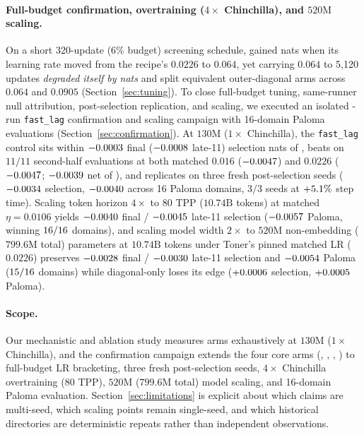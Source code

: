 \paragraph{Full-budget confirmation, overtraining ($4\times$ Chinchilla), and $520\text{M}$ scaling.}
On a short 320-update (6\% budget) screening schedule,  gained
\lrHeadroom{} nats when its learning rate moved from the recipe's $0.0226$ to
$0.064$, yet carrying $0.064$ to 5{,}120 updates \emph{degraded 
itself by \waveTwelveMuontSelDiff{} nats} and split equivalent outer-diagonal
arms across $0.064$ and $0.0905$ (Section~\ref{sec:tuning}). To close full-budget
tuning, same-runner null attribution, post-selection replication, and scaling,
we executed an isolated \confTotalRuns{}-run \texttt{fast\_lag} confirmation and
scaling campaign with \confPalomaCount{} 16-domain Paloma evaluations
(Section~\ref{sec:confirmation}). At $130\text{M}$ ($1\times$ Chinchilla), the
\texttt{fast\_lag}  control sits within
$-0.0003{}$ final ($-0.0008{}$ late-11) selection
nats of ,  beats  on $11/11$
second-half evaluations at both matched $0.016$ ($-0.0047{}$)
and $0.0226$ ($-0.0047{}$; $-0.0039{}$
net of ), and replicates on three fresh post-selection seeds
($-0.0034{}$ selection, $-0.0040{}$ across 16
Paloma domains, $3/3$ seeds at $+5.1\%$ step time). Scaling token
horizon $4\times$ to $80$ TPP ($10.74\text{B}$ tokens) at matched $\eta = 0.0106$
yields $-0.0040{}$ final / $-0.0045{}$ late-11
selection ($-0.0057{}$ Paloma, winning
$16{}/16$ domains), and scaling model width $2\times$ to
$520\text{M}$ non-embedding ($799.6\text{M}$ total) parameters at $10.74\text{B}$
tokens under Toner's pinned matched LR ($0.0226$) preserves
$-0.0028{}$ final / $-0.0030{}$ late-11 selection and
$-0.0054{}$ Paloma ($15{}/16$ domains) while
diagonal-only  loses its edge ($+0.0006{}$ selection,
$+0.0005{}$ Paloma).

\paragraph{Scope.}
Our mechanistic and ablation study measures \nOptimizerArms{} arms exhaustively
at $130\text{M}$ ($1\times$ Chinchilla), and the confirmation campaign extends
the four core arms (, , ,
) to full-budget LR bracketing, three fresh post-selection
seeds, $4\times$ Chinchilla overtraining ($80$ TPP), $520\text{M}$ ($799.6\text{M}$
total) model scaling, and 16-domain Paloma evaluation.
Section~\ref{sec:limitations} is explicit about which claims are multi-seed,
which scaling points remain single-seed, and which historical directories are
deterministic repeats rather than independent observations.

